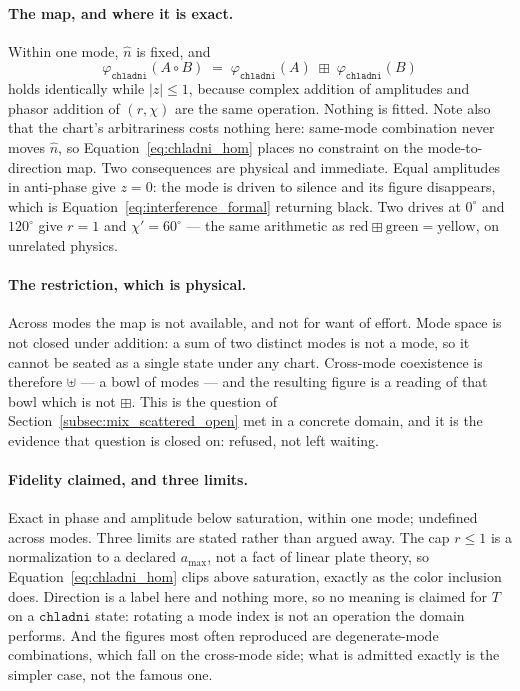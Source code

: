 \documentclass[12pt, a4paper]{article}
\begin{document}
\paragraph{The map, and where it is exact.}
Within one mode, $\hat n$ is fixed, and
\begin{equation}
    \varphi_{\mathtt{chladni}}(A\circ B)
    \;=\;
    \varphi_{\mathtt{chladni}}(A)\;\boxplus\;\varphi_{\mathtt{chladni}}(B)
    \label{eq:chladni_hom}
\end{equation}
holds identically while $|z|\le 1$, because complex addition of
amplitudes and phasor addition of $(r,\chi)$ are the same operation.
Nothing is fitted. Note also that the chart's arbitrariness costs
nothing here: same-mode combination never moves $\hat n$, so
Equation~\eqref{eq:chladni_hom} places no constraint on the
mode-to-direction map. Two consequences are physical and immediate.
Equal amplitudes in anti-phase give $z=0$: the mode is driven to
silence and its figure disappears, which is
Equation~\eqref{eq:interference_formal} returning black. Two drives at
$0^\circ$ and $120^\circ$ give $r=1$ and $\chi'=60^\circ$ --- the same
arithmetic as $\mathrm{red}\boxplus\mathrm{green}=\mathrm{yellow}$,
on unrelated physics.

\paragraph{The restriction, which is physical.}
Across modes the map is not available, and not for want of effort.
Mode space is not closed under addition: a sum of two distinct modes
is not a mode, so it cannot be seated as a single state under any
chart. Cross-mode coexistence is therefore $\uplus$ --- a bowl of
modes --- and the resulting figure is a reading of that bowl which is
not $\boxplus$. This is the question of
Section~\ref{subsec:mix_scattered_open} met in a concrete domain, and
it is the evidence that question is closed on: refused, not left
waiting.

\paragraph{Fidelity claimed, and three limits.}
Exact in phase and amplitude below saturation, within one mode;
undefined across modes. Three limits are stated rather than argued
away. The cap $r\le 1$ is a normalization to a declared $a_{\max}$,
not a fact of linear plate theory, so
Equation~\eqref{eq:chladni_hom} clips above saturation, exactly as the
color inclusion does. Direction is a label here and nothing more,
so no meaning is claimed for $T$ on a $\mathtt{chladni}$ state:
rotating a mode index is not an operation the domain performs. And the
figures most often reproduced are degenerate-mode combinations, which
fall on the cross-mode side; what is admitted exactly is the simpler
case, not the famous one.
\end{document}
